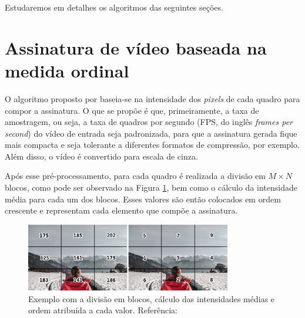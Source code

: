\label{sec:desenv}
Estudaremos em detalhes os algoritmos das seguintes seções.


%
%
\section{Assinatura de vídeo baseada na medida ordinal}
\label{sec:med_ordinal}

	O algoritmo proposto por \cite{hua2004robust} baseia-se na intensidade dos \textit{pixels} de cada quadro para compor a assinatura. O que se propõe é que, primeiramente, a taxa de amostragem, ou seja, a taxa de quadros por segundo (FPS, do inglês \textit{frames per second}) do vídeo de entrada seja padronizada, para que a assinatura gerada fique mais compacta e seja tolerante a diferentes formatos de compressão, por exemplo. Além disso, o vídeo é convertido para escala de cinza.

Após esse pré-processamento, para cada quadro é realizada a divisão em $M \times N$ blocos, como pode ser observado na Figura \ref{fig:medidaord}, bem como o cálculo da intensidade média para cada um dos blocos. Esses valores são então colocados em ordem crescente e representam cada elemento que compõe a assinatura.

	\begin{figure}[h]
        \centering
        \includegraphics[width=0.8\textwidth]{dados/figuras/mo_final.png}
        \caption{Exemplo com a divisão em blocos, cálculo das intensidades médias e ordem atribuída a cada valor. Referência: \cite{sylvio2015}}
    	\label{fig:medidaord}
    \end{figure}


%
%


